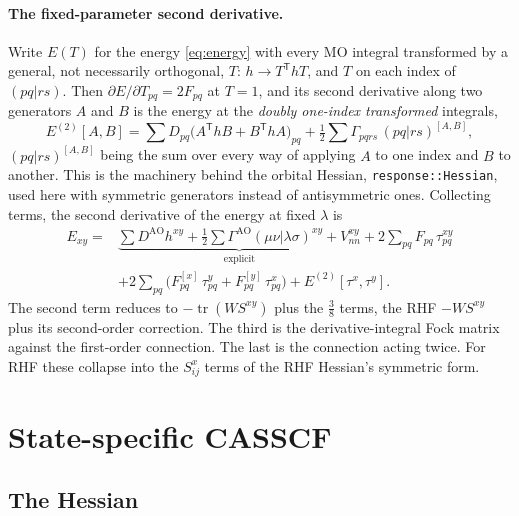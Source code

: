 \documentclass[11pt]{article}
\newcommand{\code}[1]{\texttt{#1}}
\newcommand{\tr}{\operatorname{tr}}
\begin{document}
\paragraph{The fixed-parameter second derivative.} Write $E(T)$ for the
energy \eqref{eq:energy} with every MO integral transformed by a general,
not necessarily orthogonal, $T$: $h \to T^{\mathsf T}hT$, and $T$ on each
index of $(pq|rs)$. Then $\partial E/\partial T_{pq} = 2F_{pq}$ at $T =
1$, and its second derivative along two generators $A$ and $B$ is the
energy at the \emph{doubly one-index transformed} integrals,
\begin{equation}
  E^{(2)}[A,B] = \sum D_{pq}\bigl(A^{\mathsf T}hB + B^{\mathsf T}hA\bigr)_{pq}
  + \tfrac12\sum\Gamma_{pqrs}\,(pq|rs)^{[A,B]},
\end{equation}
$(pq|rs)^{[A,B]}$ being the sum over every way of applying $A$ to one
index and $B$ to another. This is the machinery behind the orbital
Hessian, \code{response::Hessian}, used here with symmetric generators
instead of antisymmetric ones. Collecting terms, the second derivative of
the energy at fixed $\lambda$ is
\begin{equation}
\boxed{\;
\begin{aligned}
  E_{xy} ={}& \underbrace{\sum D^{\mathrm{AO}} h^{xy}
     + \tfrac12\sum\Gamma^{\mathrm{AO}}(\mu\nu|\lambda\sigma)^{xy}
     + V_{nn}^{xy}}_{\text{explicit}}
   + 2\sum_{pq}F_{pq}\,\tau^{xy}_{pq}\\
  &+ 2\sum_{pq}\bigl(F^{[x]}_{pq}\,\tau^y_{pq} + F^{[y]}_{pq}\,\tau^x_{pq}\bigr)
   + E^{(2)}[\tau^x, \tau^y].
\end{aligned}\;}
\label{eq:exy}
\end{equation}
The second term reduces to $-\tr(WS^{xy})$ plus the $\frac38$ terms, the
RHF $-WS^{xy}$ plus its second-order correction. The third is the
derivative-integral Fock matrix against the first-order connection. The
last is the connection acting twice. For RHF these collapse into the
$S^{x}_{ij}$ terms of the RHF Hessian's symmetric form.

\section{State-specific CASSCF}
\label{sec:ss}

\subsection{The Hessian}
\end{document}

